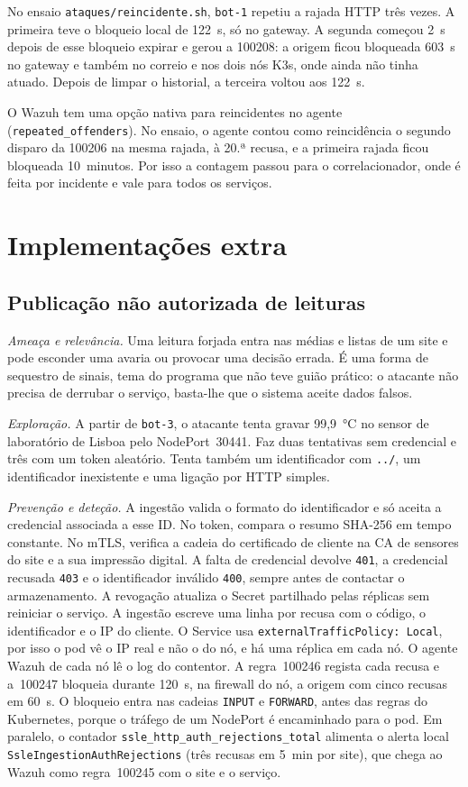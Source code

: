 \documentclass[conference,a4paper]{IEEEtran}
\newcommand{\code}[1]{\texttt{\small #1}}
\begin{document}
No ensaio \code{ataques/reincidente.sh}, \code{bot-1} repetiu a rajada HTTP três vezes. A primeira teve o bloqueio local de 122~s, só no gateway. A segunda começou 2~s depois de esse bloqueio expirar e gerou a 100208: a origem ficou bloqueada 603~s no gateway e também no correio e nos dois nós K3s, onde ainda não tinha atuado. Depois de limpar o historial, a terceira voltou aos 122~s.

O Wazuh tem uma opção nativa para reincidentes no agente (\code{repeated\_offenders}). No ensaio, o agente contou como reincidência o segundo disparo da 100206 na mesma rajada, à 20.ª recusa, e a primeira rajada ficou bloqueada 10~minutos. Por isso a contagem passou para o correlacionador, onde é feita por incidente e vale para todos os serviços.

\section{Implementações extra}
\subsection{Publicação não autorizada de leituras}\label{sec:publicacao}
\emph{Ameaça e relevância.} Uma leitura forjada entra nas médias e listas de um site e pode esconder uma avaria ou provocar uma decisão errada. É uma forma de sequestro de sinais, tema do programa que não teve guião prático: o atacante não precisa de derrubar o serviço, basta-lhe que o sistema aceite dados falsos.

\emph{Exploração.} A partir de \code{bot-3}, o atacante tenta gravar 99,9~°C no sensor de laboratório de Lisboa pelo NodePort~30441. Faz duas tentativas sem credencial e três com um token aleatório. Tenta também um identificador com \code{../}, um identificador inexistente e uma ligação por HTTP simples.

\emph{Prevenção e deteção.} A ingestão valida o formato do identificador e só aceita a credencial associada a esse ID. No token, compara o resumo SHA-256 em tempo constante. No mTLS, verifica a cadeia do certificado de cliente na CA de sensores do site e a sua impressão digital. A falta de credencial devolve \code{401}, a credencial recusada \code{403} e o identificador inválido \code{400}, sempre antes de contactar o armazenamento. A revogação atualiza o Secret partilhado pelas réplicas sem reiniciar o serviço. A ingestão escreve uma linha por recusa com o código, o identificador e o IP do cliente. O Service usa \code{externalTrafficPolicy: Local}, por isso o pod vê o IP real e não o do nó, e há uma réplica em cada nó. O agente Wazuh de cada nó lê o log do contentor. A regra~100246 regista cada recusa e a~100247 bloqueia durante 120~s, na firewall do nó, a origem com cinco recusas em 60~s. O bloqueio entra nas cadeias \code{INPUT} e \code{FORWARD}, antes das regras do Kubernetes, porque o tráfego de um NodePort é encaminhado para o pod. Em paralelo, o contador \code{ssle\_http\_auth\_rejections\_total} alimenta o alerta local \code{SsleIngestionAuthRejections} (três recusas em 5~min por site), que chega ao Wazuh como regra~100245 com o site e o serviço.
\end{document}
